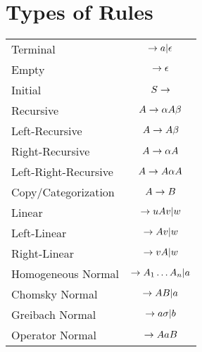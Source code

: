 \section{Types of Rules}

\begin{table}[H]
    \centering
    \begin{tabularx}{\textwidth}{| l | c |}
        Terminal & $\rightarrow a | \epsilon$ \\
        Empty & $\rightarrow \epsilon$ \\
        Initial & $S \rightarrow$ \\
        Recursive & $A \rightarrow \alpha A \beta$ \\
        Left-Recursive & $A \rightarrow A \beta$ \\
        Right-Recursive & $A \rightarrow \alpha A$ \\
        Left-Right-Recursive & $A \rightarrow A \alpha A$ \\
        Copy/Categorization & $A \rightarrow B$ \\
        Linear & $\rightarrow u A v | w$ \\
        Left-Linear & $\rightarrow A v | w$ \\
        Right-Linear & $\rightarrow v A | w$ \\
        Homogeneous Normal & $\rightarrow A_1\ldots A_n | a$ \\
        Chomsky Normal & $\rightarrow AB | a$ \\
        Greibach Normal & $\rightarrow a\sigma | b$ \\
        Operator Normal & $\rightarrow A a B$ \\
    \end{tabularx}
\end{table}
